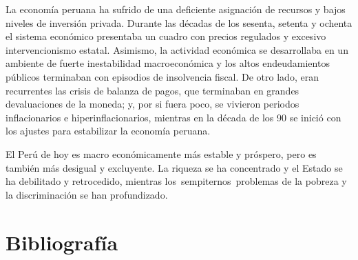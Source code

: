 \documentclass[
  jou,
  floatsintext,
  longtable,
  a4paper,
  nolmodern,
  notxfonts,
  notimes,
  colorlinks=true,linkcolor=blue,citecolor=blue,urlcolor=blue]{apa7}
\begin{document}
La economía peruana ha sufrido de una deficiente asignación de recursos
y bajos niveles de inversión privada. Durante las décadas de los
sesenta, setenta y ochenta el sistema económico presentaba un cuadro con
precios regulados y excesivo intervencionismo estatal. Asimismo, la
actividad económica se desarrollaba en un ambiente de fuerte
inestabilidad macroeconómica y los altos endeudamientos públicos
terminaban con episodios de insolvencia fiscal. De otro lado, eran
recurrentes las crisis de balanza de pagos, que terminaban en grandes
devaluaciones de la moneda; y, por si fuera poco, se vivieron periodos
inflacionarios e hiperinflacionarios, mientras en la década de los 90 se
inició con los ajustes para estabilizar la economía peruana.

El Perú de hoy es macro económicamente más estable y próspero, pero es
también más desigual y excluyente. La riqueza se ha concentrado y el
Estado se ha debilitado y retrocedido, mientras
los~sempiternos~problemas de la pobreza y la discriminación se han
profundizado.

\section{Bibliografía}\label{bibliografuxeda}
\end{document}
